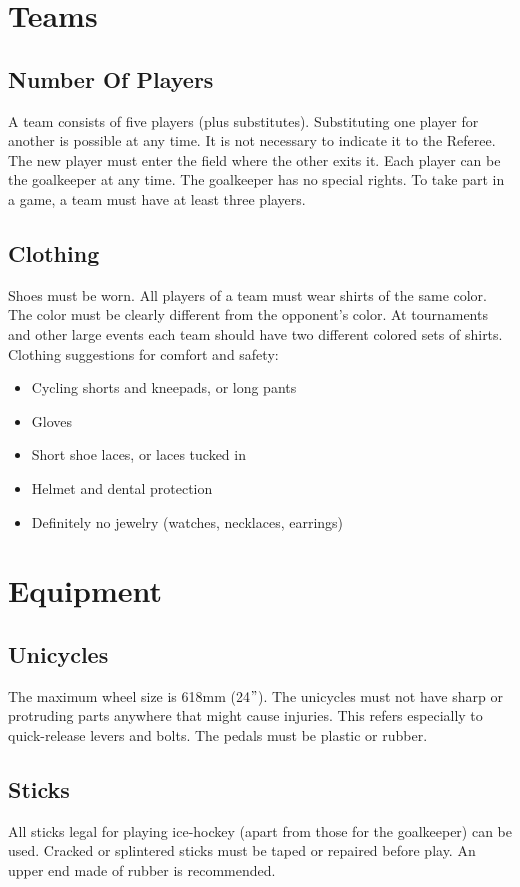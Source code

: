 \section{Teams}

\subsection{Number Of Players}
A team consists of five players (plus substitutes).
Substituting one player for another is possible at any time.
It is not necessary to indicate it to the Referee.
The new player must enter the field where the other exits it.
Each player can be the goalkeeper at any time.
The goalkeeper has no special rights.
To take part in a game, a team must have at least three players.

\subsection{Clothing}
Shoes must be worn.
All players of a team must wear shirts of the same color.
The color must be clearly different from the opponent's color.
At tournaments and other large events each team should have two different colored sets of shirts.\\
Clothing suggestions for comfort and safety:
\begin{itemize}
\item Cycling shorts and kneepads, or long pants
\item Gloves
\item Short shoe laces, or laces tucked in
\item Helmet and dental protection
\item Definitely no jewelry (watches, necklaces, earrings)
\end{itemize}

\section{Equipment}

\subsection{Unicycles}
The maximum wheel size is 618mm (24$"$).
The unicycles must not have sharp or protruding parts anywhere that might cause injuries.
This refers especially to quick-release levers and bolts.
The pedals must be plastic or rubber.

\subsection{Sticks}
All sticks legal for playing ice-hockey (apart from those for the goalkeeper) can be used.
Cracked or splintered sticks must be taped or repaired before play.
An upper end made of rubber is recommended.

